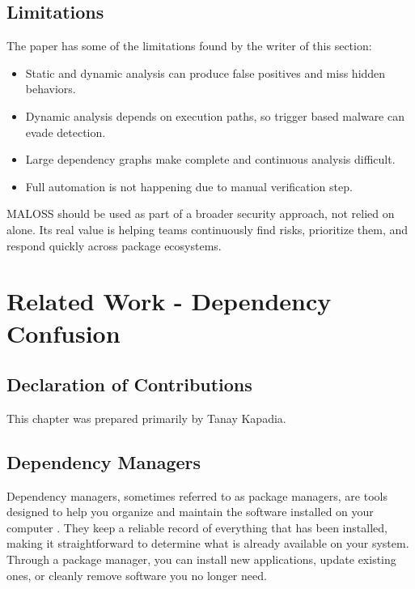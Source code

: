 \section{Limitations}

The paper has some of the limitations found by the writer of this section:

\begin{itemize} \setlength\itemsep{0.2em}\setlength\parskip{0pt}
\item Static and dynamic analysis can produce false positives and miss hidden behaviors.
\item Dynamic analysis depends on execution paths, so trigger based malware can evade detection.
\item Large dependency graphs make complete and continuous analysis difficult.
\item Full automation is not happening due to manual verification step.
\end{itemize}

MALOSS should be used as part of a broader security approach, not relied on alone. Its real value is helping teams continuously find risks, prioritize them, and respond quickly across package ecosystems.


\chapter{Related Work - Dependency Confusion}
\label{ch:related-dependency-confusion}

\section*{Declaration of Contributions}
This chapter was prepared primarily by Tanay Kapadia.

\section{Dependency Managers}

Dependency managers, sometimes referred to as package managers, are tools designed to help you organize and maintain the software installed on your computer \cite{matt2017dependencymanagers}. They keep a reliable record of everything that has been installed, making it straightforward to determine what is already available on your system. Through a package manager, you can install new applications, update existing ones, or cleanly remove software you no longer need.

